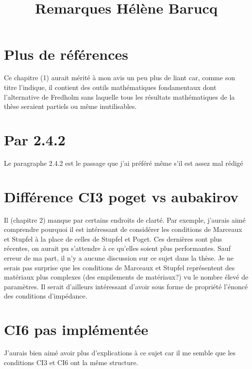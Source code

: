 \documentclass{article}
\title{Remarques Hélène Barucq}
\date{}
\begin{document}
\maketitle

\section{Plus de références}
\begin{cite}
    Ce chapitre (1) aurait mérité à mon avis un peu plus de liant car, comme son titre l’indique, il contient des outils mathématiques fondamentaux dont l’alternative de Fredholm sans laquelle tous les résultats mathématiques de la thèse seraient partiels ou même inutilisables.
\end{cite}


\section{Par 2.4.2}
\begin{cite}
    Le paragraphe 2.4.2 est le passage que j’ai préféré même s’il est assez mal rédigé
\end{cite}

\section{Différence CI3 poget vs aubakirov}
\begin{cite}
    Il (chapitre 2) manque par certains endroits de clarté.
    Par exemple, j’aurais aimé comprendre pourquoi il est intéressant de considérer les conditions de Marceaux et Stupfel à la place de celles de Stupfel et Poget.
    Ces dernières sont plus récentes, on
    aurait pu s’attendre à ce qu’elles soient plus performantes.
    Sauf erreur de ma part, il n’y a aucune discussion sur ce sujet dans la thèse.
    Je ne serais pas surprise que les conditions de Marceaux et Stupfel représentent des matériaux plus complexes (des empilements de matériaux?) vu le nombre élevé de paramètres.
    Il serait d’ailleurs intéressant d’avoir sous forme de propriété l’énoncé des conditions d’impédance.
\end{cite}

\section{CI6 pas implémentée}
\begin{cite}
    J’aurais bien aimé avoir plus d’explications à ce sujet car il me semble que les conditions CI3 et CI6 ont la même structure.
\end{cite}
\end{document}
